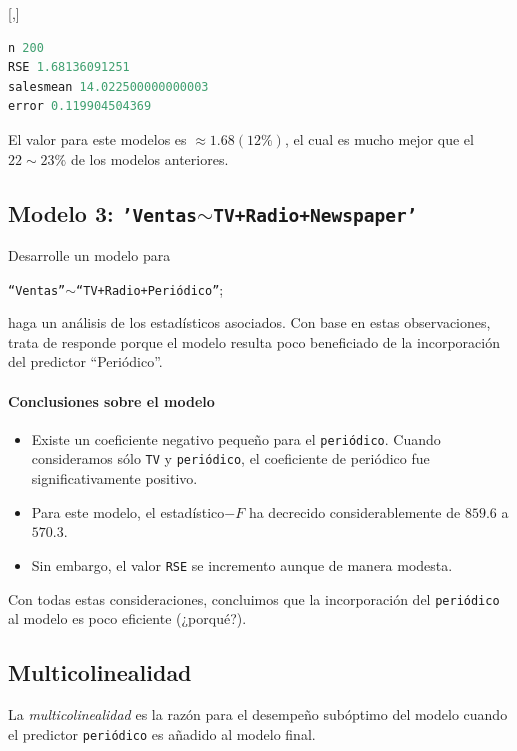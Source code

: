 [,]{}
\begin{lstlisting}[language=Python]
n 200
RSE 1.68136091251
salesmean 14.022500000000003
error 0.119904504369
\end{lstlisting}


El valor para este modelos es $\approx 1.68 (12\%)$, el cual es mucho mejor que el $22\sim23\%$ de los modelos anteriores.

\subsection{Modelo 3: \texttt{'Ventas$\sim$TV+Radio+Newspaper'}}

\begin{problema}
 Desarrolle un modelo para
 \begin{center}
  \texttt{``Ventas''$\sim$``TV+Radio+Periódico''};
 \end{center}
 haga un análisis de los estadísticos asociados.  Con base en estas observaciones, trata de responde porque el modelo resulta poco beneficiado de la incorporación del predictor ``Periódico''.
\end{problema}


\paragraph{Conclusiones sobre el modelo}
\begin{itemize}
 \item Existe un coeficiente negativo pequeño para el \texttt{periódico}.  Cuando consideramos sólo \texttt{TV} y \texttt{periódico}, el coeficiente de periódico fue significativamente positivo. 
 \item Para este modelo, el estadístico$-F$ ha decrecido considerablemente de $859.6$ a $570.3$. 
 \item Sin embargo, el valor \texttt{RSE} se incremento aunque de manera modesta. 
\end{itemize}
Con todas estas consideraciones, concluimos que la incorporación del \texttt{periódico} al modelo es poco eficiente (¿porqué?).

\subsection{Multicolinealidad}

La \emph{multicolinealidad} es la razón para el desempeño subóptimo del modelo cuando el predictor \texttt{periódico} es añadido al modelo final.

